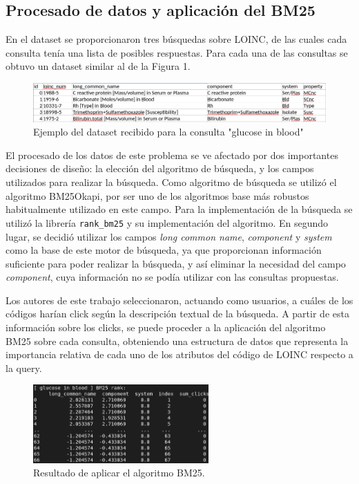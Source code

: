 \documentclass[a4paper,12pt]{article}
\begin{document}
	\subsection{Procesado de datos y aplicación del BM25}
	
	En el dataset se proporcionaron tres búsquedas sobre LOINC, de las cuales cada consulta tenía una lista de posibles respuestas.
	Para cada una de las consultas se obtuvo un dataset similar al de la Figura 1.
	
	 \begin{figure}[H]
	 	\centering
	 	\includegraphics[width=\textwidth]{include/query_example_orig.png}
	 	\caption{Ejemplo del dataset recibido para la consulta "glucose in blood"}
	 \end{figure}
	
	El procesado de los datos de este problema se ve afectado por dos importantes decisiones de diseño: la elección del algoritmo de búsqueda, y los campos utilizados para realizar la búsqueda. 	
	Como algoritmo de búsqueda se utilizó el algoritmo BM25Okapi, por ser uno de los algoritmos base más robustos habitualmente utilizado en este campo. Para la implementación de la búsqueda se utilizó la librería \texttt{rank\_bm25} y su implementación del algoritmo.
	En segundo lugar, se decidió utilizar los campos \textit{long common name}, \textit{component} y \textit{system} como la base de este motor de búsqueda, ya que proporcionan información suficiente para poder realizar la búsqueda, y así eliminar la necesidad del campo \textit{component}, cuya información no se podía utilizar con las consultas propuestas.
	
	Los autores de este trabajo seleccionaron, actuando como usuarios, a cuáles de los códigos harían click según la descripción textual de la búsqueda. A partir de esta información sobre los clicks, se puede proceder a la aplicación del algoritmo BM25 sobre cada consulta, obteniendo una estructura de datos que representa la importancia relativa de cada uno de los atributos del código de LOINC respecto a la query.
	
	\begin{figure}[H]
		\centering
		\includegraphics[width=0.6\textwidth]{include/bm25rank_glucoseBlood.png}
		\caption{Resultado de aplicar el algoritmo BM25.}
	\end{figure}
	
\end{document}
